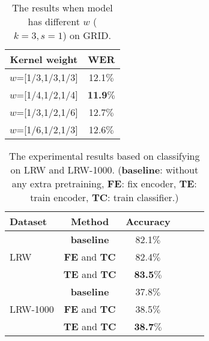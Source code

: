 \documentclass[a4paper, 10pt, conference]{ieeeconf}      %
\begin{document}
\begin{table}[H]
	\caption{The results when model has different $w$ ($k=3,s=1$) on GRID.} \label{table3}
	\centering
	\begin{tabular}{|c||c|}    
		\hline
		Kernel weight&     WER   \\
		\hline
		\hline
		$w$=[1/3,1/3,1/3]& 12.1$\%$\\
		$w$=[1/4,1/2,1/4]&\textbf{11.9$\%$} \\
		$w$=[1/3,1/2,1/6]&12.7$\%$ \\
		$w$=[1/6,1/2,1/3]&12.6$\%$ \\  
		\hline
	\end{tabular}
\end{table}
\vspace{-0.4cm}
\begin{table}[H]
	\setlength{\abovecaptionskip}{0.6cm}   %
	\setlength{\belowcaptionskip}{0cm} 
	\centering
	\caption{The experimental results based on classifying on LRW and LRW-1000. (\textbf{baseline}: without any extra pretraining, \textbf{FE}: fix encoder, \textbf{TE}: train encoder, \textbf{TC}: train classifier.) 
		\vspace{-0.6cm}} \label{table4}
	\begin{tabular}{|p{1.39cm}|c|c|ccr}    
		\hline
		Dataset & Method&  Accuracy \\
		\hline
		\hline
		\multirow{3}{*}{LRW}&\textbf{baseline} & 82.1$\%$  \\
		~&\textbf{FE} and \textbf{TC}&  82.4$\%$ \\
		~&\textbf{TE} and \textbf{TC} & \textbf{83.5}$\%$  \\
		\hline
		\multirow{3}{*}{LRW-1000}&\textbf{baseline} & 37.8$\%$      \\
		~&\textbf{FE} and \textbf{TC} &  38.5$\%$     \\
		~&\textbf{TE} and \textbf{TC} &\textbf{38.7}$\%$      \\
		\hline
	\end{tabular}
	
\end{table}

\vspace{-0.5cm}
\end{document}
